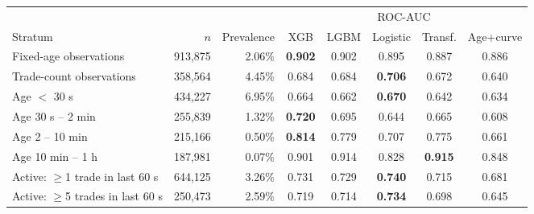 \begin{tabular}{lrrccccc}
\toprule
 & & & \multicolumn{5}{c}{ROC-AUC} \\
\cmidrule(lr){4-8}
Stratum & $n$ & Prevalence & XGB & LGBM & Logistic & Transf. & Age+curve \\
\midrule
Fixed-age observations & 913{,}875 & 2.06\% & \textbf{0.902} & 0.902 & 0.895 & 0.887 & 0.886 \\
Trade-count observations & 358{,}564 & 4.45\% & 0.684 & 0.684 & \textbf{0.706} & 0.672 & 0.640 \\
Age $<$ 30 s & 434{,}227 & 6.95\% & 0.664 & 0.662 & \textbf{0.670} & 0.642 & 0.634 \\
Age 30 s -- 2 min & 255{,}839 & 1.32\% & \textbf{0.720} & 0.695 & 0.644 & 0.665 & 0.608 \\
Age 2 -- 10 min & 215{,}166 & 0.50\% & \textbf{0.814} & 0.779 & 0.707 & 0.775 & 0.661 \\
Age 10 min -- 1 h & 187{,}981 & 0.07\% & 0.901 & 0.914 & 0.828 & \textbf{0.915} & 0.848 \\
Active: $\geq$1 trade in last 60 s & 644{,}125 & 3.26\% & 0.731 & 0.729 & \textbf{0.740} & 0.715 & 0.681 \\
Active: $\geq$5 trades in last 60 s & 250{,}473 & 2.59\% & 0.719 & 0.714 & \textbf{0.734} & 0.698 & 0.645 \\
\bottomrule
\end{tabular}
